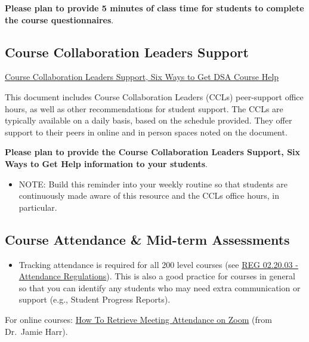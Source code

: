 \documentclass[
]{book}
\providecommand{\tightlist}{%
  \setlength{\itemsep}{0pt}\setlength{\parskip}{0pt}}
\begin{document}
{ \textbf{Please plan to provide 5 minutes of class time for students to complete the course questionnaires}. }

\subsection{Course Collaboration Leaders Support}\label{course-collaboration-leaders-support}

\href{https://docs.google.com/document/d/1ZNli1SdLy-AdxarjaNLSRpQOmh9q9KsAvqzWCcb_Wrg/edit?usp=sharing}{Course Collaboration Leaders Support, Six Ways to Get DSA Course Help}

This document includes Course Collaboration Leaders (CCLs) peer-support office hours, as well as other recommendations for student support. The CCLs are typically available on a daily basis, based on the schedule provided. They offer support to their peers in online and in person spaces noted on the document.

{ \textbf{Please plan to provide the Course Collaboration Leaders Support, Six Ways to Get Help information to your students}. }

\begin{itemize}
\tightlist
\item
  NOTE: Build this reminder into your weekly routine so that students are continuously made aware of this resource and the CCLs office hours, in particular.
\end{itemize}

\subsection{Course Attendance \& Mid-term Assessments}\label{course-attendance-mid-term-assessments}

\begin{itemize}
\tightlist
\item
  Tracking attendance is required for all 200 level courses (see \href{https://policies.ncsu.edu/regulation/reg-02-20-03-attendance-regulations/}{REG 02.20.03 - Attendance Regulations}). This is also a good practice for courses in general so that you can identify any students who may need extra communication or support (e.g., Student Progress Reports).
\end{itemize}

For online courses: \href{https://drive.google.com/file/d/19vuYwyGcMrrBjQVzWbaDph1aHUR7u2bu/view?usp=drive_link}{How To Retrieve Meeting Attendance on Zoom} (from Dr.~Jamie Harr).
\end{document}

